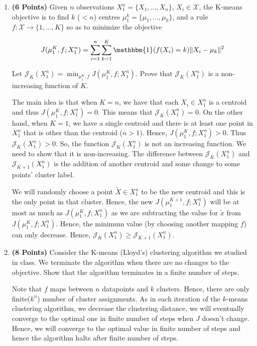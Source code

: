 \documentclass[a4paper]{article}
\newcounter{thm}
\newcommand{\Xcal}{\mathcal{X}}
\newcommand{\Jcal}{\mathcal{J}}
\newcommand{\indfone}{\mathbbm{1}}
\theoremstyle{definition}
\newenvironment{soln}{
    \leavevmode\color{blue}\ignorespaces
}{}
\begin{document}
\begin{enumerate}

\item \textbf{(6 Points)}
Given $n$ observations $X_1^n = \{X_1, \dots, X_n\}$, $X_i \in \Xcal$, the K-means objective
is to find $k$
($<n$) centres $\mu_1^k = \{\mu_1, \dots, \mu_k\}$, and a rule $f:\Xcal \rightarrow
\{1,\dots, K\}$ so as to minimize the objective

\begin{equation}
J(\mu_1^K, f; X_1^n) = \sum_{i=1}^n \sum_{k=1}^K \indfone(f(X_i) = k) \|X_i - \mu_k\|^2
\label{eqn:kmeans}
\end{equation}

Let $\Jcal_K(X_1^n) = \min_{\mu_1^K, f} J(\mu_1^K, f; X_1^n)$. Prove that
$\Jcal_{K}(X_1^n)$ is a non-increasing function of $K$.

\begin{soln}
    The main idea is that when $K = n$, we have that each $X_i \in X_1^{n}$ is a centroid and thus $J(\mu_1^K, f; X_1^n) = 0$. This means that $\mathcal{J}_K(X_1^n) = 0$. On the other hand, when $K = 1$, we have a single centroid and there is at least one point in $X_1^n$ that is other than the centroid ($n > 1$). Hence, $J(\mu_1^K, f; X_1^n) > 0$. Thus $\mathcal{J}_K(X_1^n) > 0$. So, the function $\mathcal{J}_K(X_1^n)$ is not an increasing function. We need to show that it is non-increasing. The difference between $\mathcal{J}_K(X_1^n)$ and $\mathcal{J}_{K+1}(X_1^n)$ is the addition of another centroid and some change to some points' cluster label.

    We will randomly choose a point $\tilde{X} \in X_1^n$ to be the new centroid and this is the only point in that cluster. Hence, the new $J(\mu_1^{K+1}, f; X_1^n)$ will be at most as much as $J(\mu_1^{K}, f; X_1^n)$ as we are subtracting the value for $\tilde{x}$ from $J(\mu_1^{K}, f; X_1^n)$. Hence, the minimum value (by choosing another mapping $f$) can only decrease. Hence, $\mathcal{J}_K(X_1^n) \geq \mathcal{J}_{K+1}(X_1^n)$.
\end{soln}

\item \textbf{(8 Points)}
Consider the K-means (Lloyd's) clustering algorithm we studied in class. We
terminate the algorithm when there are no changes to the objective.
Show that the algorithm terminates in a finite number of steps.

\begin{soln}
    Note that $f$ maps between $n$ datapoints and $k$ clusters. Hence, there are only finite($k^n$) number of cluster assignments. As in each iteration of the $k$-means clustering algorithm, we decrease the clustering distance, we will eventually converge to the optimal one in finite number of steps when $J$ doesn't change. Hence, we will converge to the optimal value in finite number of steps and hence the algorithm halts after finite number of steps.
\end{soln}

\end{enumerate}
\end{document}
